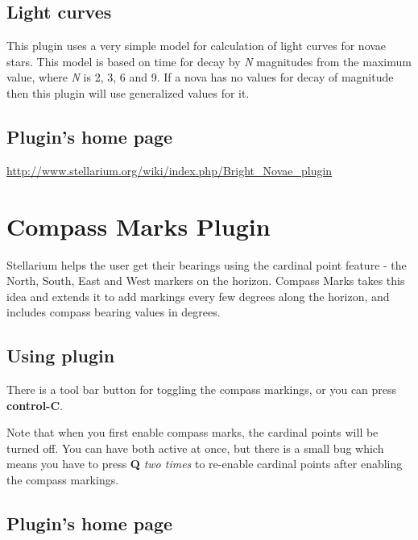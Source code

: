 \subsection{Light curves}\label{light-curves}

This plugin uses a very simple model for calculation of light curves for
novae stars. This model is based on time for decay by \emph{N}
magnitudes from the maximum value, where \emph{N} is 2, 3, 6 and 9. If a
nova has no values for decay of magnitude then this plugin will use
generalized values for it.

\subsection{Plugin's home page}\label{plugins-home-page-1}

\url{http://www.stellarium.org/wiki/index.php/Bright_Novae_plugin}

\section{Compass Marks Plugin}\label{compass-marks-plugin}


Stellarium helps the user get their bearings using the cardinal point
feature - the North, South, East and West markers on the horizon.
Compass Marks takes this idea and extends it to add markings every few
degrees along the horizon, and includes compass bearing values in
degrees.

\subsection{Using plugin}\label{using-plugin-2}

There is a tool bar button for toggling the compass markings, or you can
press \textbf{control-C}.

Note that when you first enable compass marks, the cardinal points will
be turned off. You can have both active at once, but there is a small
bug which means you have to press \textbf{Q} \emph{two times} to
re-enable cardinal points after enabling the compass markings.

\subsection{Plugin's home page}\label{plugins-home-page-2}

